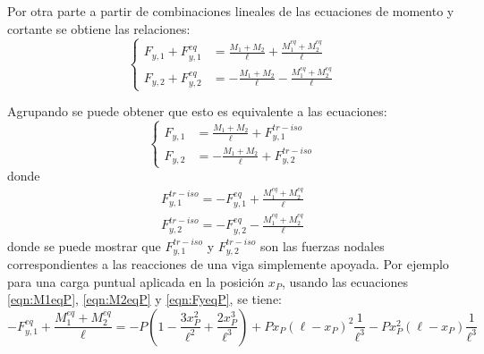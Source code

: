 
Por otra parte a partir de combinaciones lineales de las ecuaciones de momento y cortante se obtiene las relaciones:
%
\begin{equation}\label{eqn:eccortr}
\left\{
\begin{array}{rl}
\displaystyle
F_{y,1} + F_{y,1}^{eq} & \displaystyle
= \frac{M_1 + M_2}{\ell} + \frac{M_1^{eq} + M_2^{eq}}{\ell} \\[5mm]
\displaystyle
F_{y,2} + F_{y,2}^{eq} & \displaystyle
= -\frac{M_1 + M_2}{\ell} - \frac{M_1^{eq} + M_2^{eq}}{\ell}
\end{array}
\right.
\end{equation}
%

Agrupando se puede obtener que esto es equivalente a las ecuaciones:
%
\begin{equation}\label{eqn:eccortrB}
\boxed{
\left\{
\begin{array}{rl}
\displaystyle
F_{y,1} & \displaystyle
= \frac{M_1 + M_2}{\ell} + F_{y,1}^{tr-iso} \\[5mm]
\displaystyle
F_{y,2}  & \displaystyle
= -\frac{M_1 + M_2}{\ell} + F_{y,2}^{tr-iso} 
\end{array}
\right.
}
\end{equation}
%
donde
%
\begin{eqnarray}
F_{y,1}^{tr-iso} = - F_{y,1}^{eq} + \frac{M_1^{eq} + M_2^{eq}}{\ell} \nonumber\\ 
F_{y,2}^{tr-iso} = -F_{y,2}^{eq}- \frac{M_1^{eq} + M_2^{eq}}{\ell} \nonumber
\end{eqnarray}
%
donde se puede mostrar que $F_{y,1}^{tr-iso}$ y $F_{y,2}^{tr-iso}$ son las fuerzas nodales correspondientes a las reacciones de una viga simplemente apoyada. %
%
Por ejemplo para una carga puntual aplicada en la posición $x_P$, usando las ecuaciones \eqref{eqn:M1eqP}, \eqref{eqn:M2eqP} y \eqref{eqn:FyeqP}, se tiene:
%
$$
- F_{y,1}^{eq} + \frac{M_1^{eq} + M_2^{eq}}{\ell} = -P \left( 1-\frac{3x_P^2}{\ell^2} + \frac{2x_P^3}{\ell^3} \right) +  P x_P (\ell-x_P)^2 \frac{1}{\ell^3}  -P x_P^2 (\ell-x_P) \frac{1}{\ell^3}
%
$$

